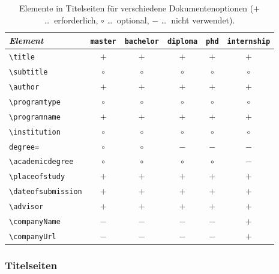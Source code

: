 \begin{table}
    \caption{Elemente in Titelseiten für verschiedene Dokumentenoptionen
        ($+$ \ldots\ erforderlich, $\circ$ \ldots\ optional, $-$ \ldots\ nicht verwendet).}
    \label{tab:TitelElemente}
    \centering\small
    \begin{tabular}{@{}lccccc@{}}
        \toprule
        \emph{Element} & \texttt{master} & \texttt{bachelor} & 
				\texttt{diploma} & \texttt{phd} & \texttt{internship} \\
        \midrule
        \verb!\title!            & $+$ & $+$ & $+$ & $+$ & $+$ \\
        \verb!\subtitle!         & $\circ$ & $\circ$ & $\circ$ & $\circ$ & $\circ$ \\
        \verb!\author!           & $+$ & $+$ & $+$ & $+$ & $+$ \\
        \verb!\programtype!      & $\circ$ & $\circ$ & $\circ$ & $\circ$ & $\circ$ \\
        \verb!\programname!      & $+$ & $+$ & $+$ & $+$ & $+$ \\
        \verb!\institution!      & $\circ$ & $\circ$ & $\circ$ & $\circ$ & $\circ$ \\
        \texttt{degree=}         & $\circ$ & $\circ$ & $-$ & $-$ & $-$ \\
        \verb!\academicdegree!   & $\circ$ & $\circ$ & $\circ$ & $\circ$ & $-$ \\
        \verb!\placeofstudy!     & $+$ & $+$ & $+$ & $+$ & $+$ \\
        \verb!\dateofsubmission! & $+$ & $+$ & $+$ & $+$ & $+$ \\
        \verb!\advisor!          & $+$ & $+$ & $+$ & $+$ & $+$ \\
        \verb!\companyName!      & $-$ & $-$ & $-$ & $-$ & $+$ \\
        \verb!\companyUrl!       & $-$ & $-$ & $-$ & $-$ & $+$ \\
        \bottomrule
    \end{tabular}
\end{table}

\subsubsection{Titelseiten}

